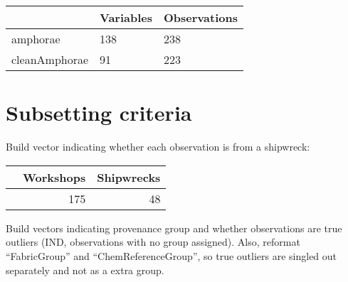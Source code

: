 \documentclass[12pt,]{book}
\newenvironment{Shaded}{\begin{snugshade}}{\end{snugshade}}
\newcommand{\NormalTok}[1]{#1}
\newcommand{\OperatorTok}[1]{\textcolor[rgb]{0.81,0.36,0.00}{\textbf{#1}}}
\newcommand{\StringTok}[1]{\textcolor[rgb]{0.31,0.60,0.02}{#1}}
\begin{document}
\begin{tabular}{l|l|l}
\hline
  & Variables & Observations\\
\hline
amphorae & 138 & 238\\
\hline
cleanAmphorae & 91 & 223\\
\hline
\end{tabular}

\hypertarget{subsetting-criteria}{%
\section{Subsetting criteria}\label{subsetting-criteria}}

Build vector indicating whether each observation is from a shipwreck:

\begin{Shaded}
\end{Shaded}

\begin{tabular}{l|r|r}
\hline
  & Workshops & Shipwrecks\\
\hline
 & 175 & 48\\
\hline
\end{tabular}

Build vectors indicating provenance group and whether observations are true outliers (IND, observations with no group assigned). Also, reformat ``FabricGroup'' and ``ChemReferenceGroup'', so true outliers are singled out separately and not as a extra group.
\end{document}
